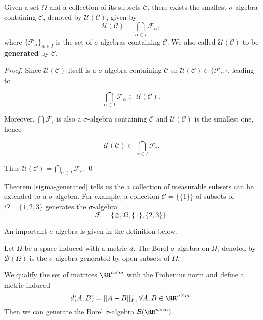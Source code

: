 \begin{theorem}
    \label{sigma-generated}
    Given a set $\Omega$ and a collection of its subsets $\mathcal{C}$, there exists the smallest $\sigma$-algebra containing $\mathcal{C}$, denoted by $\mathcal{U}(\mathcal{C})$, given by
    $$\mathcal{U}(\mathcal{C})=\bigcap\limits_{\alpha\in I}\mathcal{F}_\alpha,$$
    where $\{\mathcal{F}_\alpha\}_{\alpha\in I}$ is the set of $\sigma$-algebras containing $\mathcal{C}$. We also called $\mathcal{U}(\mathcal{C})$ to be \textbf{generated} by $\mathcal{C}$.
\end{theorem}

\textit{Proof.} Since $\mathcal{U}(\mathcal{C})$ itself is a $\sigma$-algebra containing $\mathcal{C}$ so $\mathcal{U}(\mathcal{C})\in\{\mathcal{F}_\alpha\}$, leading to

$$\bigcap\limits_{\alpha\in I}\mathcal{F}_\alpha\subset \mathcal{U}(\mathcal{C}).$$

Moreover, $\bigcap\mathcal{F}_i$ is also a $\sigma$-algebra containing $\mathcal{C}$ and $\mathcal{U}(\mathcal{C})$ is the smallest one, hence

$$\mathcal{U}(\mathcal{C})\subset\bigcap\limits_{\alpha\in I}\mathcal{F}_i.$$

Thus $\mathcal{U}(\mathcal{C})=\bigcap\limits_{\alpha\in I}\mathcal{F}_i$. \qed

\begin{remark}
    Theorem \ref{sigma-generated} tells us the a collection of measurable subsets can be extended to a $\sigma$-algebra. For example, a collection $\mathcal{C}=\{\{1\}\}$ of subsets of $\Omega=\{1,2,3\}$ generates the $\sigma$-algebra
    $$\mathcal{F}=\{\varnothing,\Omega,\{1\},\{2,3\}\}.$$
\end{remark}
An important $\sigma$-algebra is given in the definition below.

\begin{definition}
    Let $\Omega$ be a space induced with a metric $d$. The Borel $\sigma$-algebra on $\Omega$, denoted by $\mathcal{B}(\Omega)$  is the $\sigma$-algebra generated by open subsets of $\Omega$.
\end{definition}

\begin{remark}
    We qualify the set of matrices $\RR^{n\times m}$ with the Frobenius norm and define a metric induced
    $$d(A,B)=||A-B||_F,\forall A,B\in \RR^{n\times m}.$$
    Then we can generate the Borel $\sigma$-algebra $\mathcal{B}(\RR^{n\times m})$.
\end{remark}

